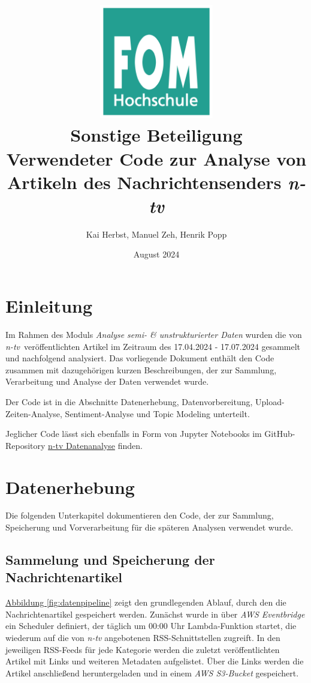 \documentclass[12pt]{article}
\title{%
    \includegraphics[width=5cm]{figures/logo.png}
    \\
    \vspace{1cm}
    \textbf{Sonstige Beteiligung}\\
    \bigskip
    \large Verwendeter Code zur Analyse von Artikeln des Nachrichtensenders \emph{n-tv}
}
\author{Kai Herbst, Manuel Zeh, Henrik Popp}
\date{August 2024}
\begin{document}
\begin{sloppypar}
	\maketitle
	\thispagestyle{empty}

	\newpage
	\setcounter{page}{1}

	\renewcommand{\contentsname}{Inhaltsverzeichnis}
	\tableofcontents

	\newpage
	\setcounter{page}{1}

	\section{Einleitung}

	Im Rahmen des Moduls \emph{Analyse semi- \& unstrukturierter Daten} wurden
	die von \emph{n-tv} veröffentlichten Artikel im Zeitraum des 17.04.2024 -
	17.07.2024 gesammelt und nachfolgend analysiert. Das vorliegende Dokument
	enthält den Code zusammen mit dazugehörigen kurzen Beschreibungen, der zur
	Sammlung, Verarbeitung und Analyse der Daten verwendet wurde.

	Der Code ist in die Abschnitte Datenerhebung, Datenvorbereitung,
	Upload-Zeiten-Analyse, Sentiment-Analyse und Topic Modeling unterteilt.

	Jeglicher Code lässt sich ebenfalls in Form von Jupyter Notebooks im
	GitHub-Repository
	\href{https://github.com/okaihe/SS2024-ASUD-Textanalyse/tree/main}{n-tv
		Datenanalyse} finden.


	\newpage
	\section{Datenerhebung}

	Die folgenden Unterkapitel dokumentieren den Code, der zur Sammlung,
	Speicherung und Vorverarbeitung für die späteren Analysen verwendet wurde.

	\subsection{Sammelung und Speicherung der Nachrichtenartikel}

	\hyperref[fig:datenpipeline]{Abbildung \ref{fig:datenpipeline}} zeigt den
	grundlegenden Ablauf, durch den die Nachrichtenartikel gespeichert werden.
	Zunächst wurde in über \emph{AWS Eventbridge} ein Scheduler definiert, der
	täglich um 00:00 Uhr Lambda-Funktion startet, die wiederum auf die von
	\emph{n-tv} angebotenen RSS-Schnittstellen zugreift. In den jeweiligen
	RSS-Feeds für jede Kategorie werden die zuletzt veröffentlichten Artikel
	mit Links und weiteren Metadaten aufgelistet. Über die Links werden die
	Artikel anschließend heruntergeladen und in einem \emph{AWS S3-Bucket}
	gespeichert.


\end{sloppypar}
\end{document}
